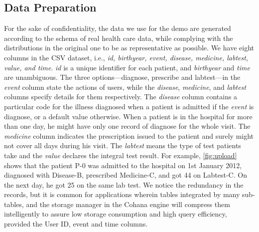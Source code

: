 \documentclass[10pt,conference,letterpaper]{IEEEtran}
\begin{document}
\subsection{Data Preparation}

For the sake of confidentiality, the data we use for the demo are generated according to the schema of real health care data, while complying with the distributions in the original one to be as representative as possible. We have eight columns in the CSV dataset, i.e., \emph{id, birthyear, event, disease, medicine, labtest, value, and time}. \emph{id} is a unique identifier for each patient, and \emph{birthyear} and \emph{time} are unambiguous. The three options---diagnose, prescribe and labtest---in the \emph{event} column state the actions of users, while the \emph{disease}, \emph{medicine}, and \emph{labtest} columns specify details for them respectively. The \emph{disease} column contains a particular code for the illness diagnosed when a patient is admitted if the \emph{event} is diagnose, or a default value otherwise. When a patient is in the hospital for more than one day, he might have only one record of diagnose for the whole visit. The \emph{medicine} column indicates the prescription issued to the patient and surely might not cover all days during his visit. The \emph{labtest} means the type of test patients take and the \emph{value} declares the integral test result. For example, \ref{fig:upload} shows that the patient P-0 was admitted to the hospital on 1st January 2012, diagnosed with Disease-B, prescribed Medicine-C, and got 44 on Labtest-C. On the next day, he got 25 on the same lab test. We notice the redundancy in the records, but it is common for applications wherein tables integrated by many sub-tables, and the storage manager in the Cohana engine will compress them intelligently to assure low storage consumption and high query efficiency, provided the User ID, event and time columns.

\end{document}
